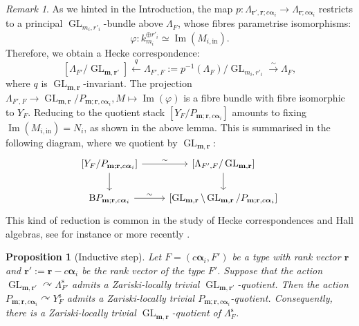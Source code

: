 \documentclass[a4paper,12pt]{article}
\theoremstyle{definition}
\theoremstyle{plain}
\newtheorem{proposition}[definition]{Proposition}
\theoremstyle{remark}
\newtheorem{remark}[definition]{Remark}
\DeclareMathOperator{\GL}{GL}
\DeclareMathOperator{\Ima}{Im}
\newcommand{\st}{\mathrm{s}}
\newcommand\bbZ{\mathbb{Z}}
\newcommand\bfalpha{\bm{\alpha}}
\newcommand\bfm{\mathbf{m}}
\newcommand\bfr{\mathbf{r}}
\begin{document}
\begin{remark}\label{Rmk/HeckeCorrespondences}
As we hinted in the Introduction, the map $p\colon \Lambda_{\bfr',\bfr;c\bfalpha_i}\rightarrow\Lambda_{\bfr;c\bfalpha_i}$ restricts to a principal $\GL_{m_i,r'_i}$-bundle above $\Lambda_F$, whose fibres parametrise isomorphisms:
\[
\varphi \colon k_{m_i}^{\oplus r'_i}\simeq \Ima(M_{i,\mathrm{in}})
.
\]
Therefore, we obtain a Hecke correspondence:
\[
[\Lambda_{F'}/\GL_{\bfm,\bfr'}]\overset{q}{\longleftarrow} \Lambda_{F',F}:=p^{-1}(\Lambda_F)/\GL_{m_i,r'_i}\overset{\sim}{\longrightarrow}\Lambda_F
,
\]
where $q$ is $\GL_{\bfm,\bfr}$-invariant. The projection $\Lambda_{F',F}\rightarrow\GL_{\bfm,\bfr}/P_{\bfm;\bfr,c\bfalpha_i}, M\mapsto \Ima(\varphi)$ is a fibre bundle with fibre isomorphic to $Y_F$. Reducing to the quotient stack $[Y_F/P_{\bfm;\bfr,c\bfalpha_i}]$ amounts to fixing $\Ima(M_{i,\mathrm{in}})=N_i$, as shown in the above lemma. This is summarised in the following diagram, where we quotient by $\GL_{\bfm,\bfr}$:
\[
\begin{tikzcd}
\left[Y_F/P_{\bfm;\bfr,c\bfalpha_i}\right] \ar[d]\ar[r,"\sim"] & \left[\Lambda_{F',F}/\GL_{\bfm,\bfr}\right] \ar[d] \\
\mathrm{B}P_{\bfm;\bfr,c\bfalpha_i} \ar[r,"\sim"] & \left[\GL_{\bfm,\bfr}\setminus\GL_{\bfm,\bfr}/P_{\bfm;\bfr,c\bfalpha_i}\right]
\end{tikzcd}
\]
This kind of reduction is common in the study of Hecke correspondences and Hall algebras, see for instance \cite{SV13a,Hen24a} or more recently \cite{GGS26}.
\end{remark}

\begin{proposition}[Inductive step]\label{prop/quotientInductiveStep}
Let $F = (c\bfalpha_i,F')$ be a type with rank vector $\bfr$ and $\bfr':=\bfr - c \bfalpha_i$ be the rank vector of the type $F'$.  
Suppose that the action $\GL_{\bfm,\bfr'}\curvearrowright\Lambda_{F'}^\st$ admits a Zariski-locally trivial $\GL_{\bfm,\bfr'}$-quotient. Then the action $P_{\bfm;\bfr,c\bfalpha_i}\curvearrowright Y_F^\st$ admits a Zariski-locally trivial $P_{\bfm;\bfr,c\bfalpha_i}$-quotient. Consequently, there is a Zariski-locally trivial $\GL_{\bfm,\bfr}$-quotient of $\Lambda^\st_F$.
\end{proposition}
\end{document}
